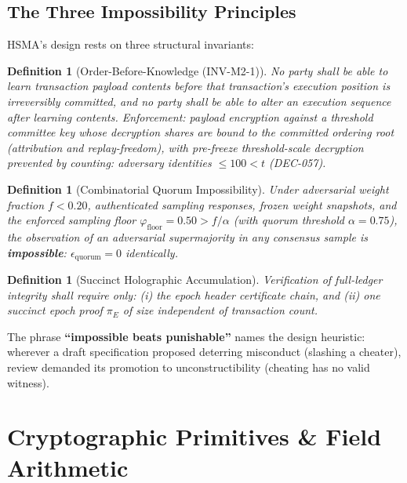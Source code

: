 \documentclass[11pt, a4paper]{article}
\newtheorem{definition}[theorem]{Definition}
\begin{document}
\subsection{The Three Impossibility Principles}

HSMA's design rests on three structural invariants:

\begin{definition}[Order-Before-Knowledge (INV-M2-1)]
No party shall be able to learn transaction payload contents before that transaction's execution position is irreversibly committed, and no party shall be able to alter an execution sequence after learning contents. Enforcement: payload encryption against a threshold committee key whose decryption shares are bound to the committed ordering root (attribution and replay-freedom), with pre-freeze threshold-scale decryption prevented by counting: adversary identities $\le 100 < t$ (DEC-057).
\end{definition}

\begin{definition}[Combinatorial Quorum Impossibility]
Under adversarial weight fraction $f < 0.20$, authenticated sampling responses, frozen weight snapshots, and the enforced sampling floor $\varphi_{\text{floor}} = 0.50 > f/\alpha$ (with quorum threshold $\alpha = 0.75$), the observation of an adversarial supermajority in any consensus sample is \textbf{impossible}: $\epsilon_{\text{quorum}} = 0$ identically.
\end{definition}

\begin{definition}[Succinct Holographic Accumulation]
Verification of full-ledger integrity shall require only: (i) the epoch header certificate chain, and (ii) one succinct epoch proof $\pi_E$ of size independent of transaction count.
\end{definition}

The phrase \textbf{``impossible beats punishable''} names the design heuristic: wherever a draft specification proposed deterring misconduct (slashing a cheater), review demanded its promotion to unconstructibility (cheating has no valid witness).

\section{Cryptographic Primitives \& Field Arithmetic}
\end{document}
